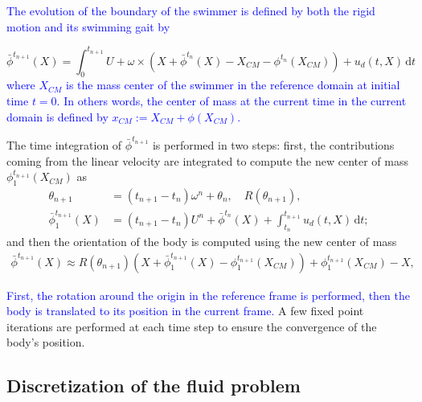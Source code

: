 \documentclass[graybox]{svmult}
\newcommand{\review}[1]{\textcolor{blue}{#1}}
\newcommand{\Fluid}{\mathcal{F}} %
\newcommand{\Alemap}{\mathcal{A}} %
\newcommand{\ALE}{ALE} %
\newcommand{\tvel}{U} %
\newcommand{\angvel}{\omega} %
\newcommand{\CompDomain}{\Fluid}
\begin{document}
\review{The evolution of the boundary of the swimmer is defined by both the rigid motion and its swimming gait by }
 
$$
\bar{\phi}^{t_{n+1}}(X) = \int_{0}^{t_{n+1}}\tvel + \angvel\times(X+\bar{\phi}^{t_n}(X)-X_{CM}- \phi^{t_n}(X_{CM})) + u_d(t,X)\, \mathrm{d}t
$$
\review{where $X_{CM}$ is the mass center of the swimmer in the reference domain at initial time $t=0$. In others words, the center of mass at the current time in the current domain is defined by $x_{CM} := X_{CM} + \phi(X_{CM})$.}

The time integration of $\bar{\phi}^{t_{n+1}}$  is performed in two steps: first, the contributions coming from the linear velocity are integrated to compute the new center of mass $\phi_1^{t_{n+1}}(X_{CM}) $ as
\begin{equation}
	\begin{aligned}
		\theta_{n+1}&= (t_{n+1}-t_n)\angvel^n + \theta_{n}, \quad R(\theta_{n+1}),\\
		\bar{\phi}_1^{t_{n+1}}(X) &= (t_{n+1}-t_n)\tvel^n + \bar{\phi}^{t_{n}}(X) + \int_{t_n}^{t_{n+1}} u_d(t,X)\, \mathrm{d}t;
	\end{aligned}
	\label{Eq:discDisp1}
\end{equation}
and then the orientation of the body is computed using the new center of mass 
\begin{multline}
	\bar{\phi}^{t_{n+1}}(X) \approx  R(\theta_{n+1}) (X+\bar{\phi}_1^{t_{n+1}}(X)- \phi_1^{t_{n+1}}(X_{CM})) + \phi_1^{t_{n+1}}(X_{CM})-X,
	\label{Eq:discDisp2}
\end{multline}

\review{First, the rotation around the origin in the reference frame is performed, then the body is translated to its position in the current frame. } A few fixed point iterations are performed at each time step to ensure the convergence of the body's position.


\subsection{Discretization of the fluid problem}
\end{document}
